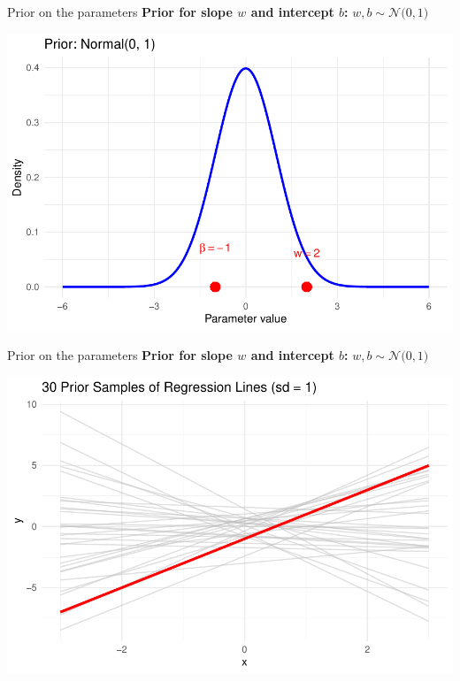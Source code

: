 \documentclass{beamer}
\begin{document}
\begin{frame}{Prior on the parameters}
  \textbf{Prior for slope \(w\) and intercept \(b\):}
  \(
    w, b \sim \mathcal{N}\big(0, 1\big)
  \)

  \begin{center}
    \includegraphics[width=0.8\linewidth]{prior_1_1.pdf}
  \end{center}
\end{frame}

\begin{frame}{Prior on the parameters}
  \textbf{Prior for slope \(w\) and intercept \(b\):}
  \(
    w, b \sim \mathcal{N}\big(0, 1\big)
  \)

  \begin{center}
    \includegraphics[width=0.8\linewidth]{prior_2_1.pdf}
  \end{center}
\end{frame}
\end{document}
